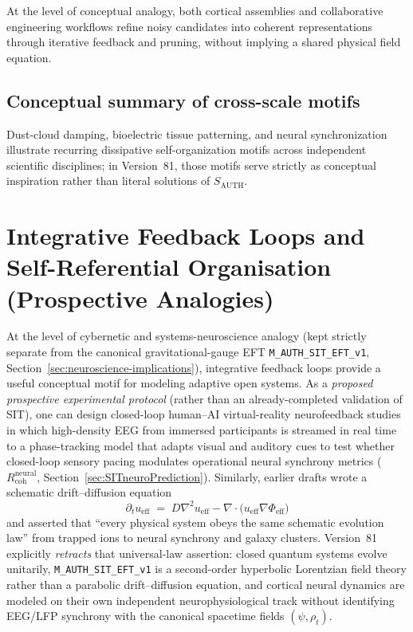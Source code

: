 At the level of conceptual analogy, both cortical assemblies and collaborative engineering workflows refine noisy candidates into coherent representations through iterative feedback and pruning, without implying a shared physical field equation.

\subsection*{Conceptual summary of cross-scale motifs}

Dust-cloud damping, bioelectric tissue patterning, and neural synchronization illustrate recurring dissipative self-organization motifs across independent scientific disciplines; in Version~81, those motifs serve strictly as conceptual inspiration rather than literal solutions of $S_{\mathrm{AUTH}}$.

\section{Integrative Feedback Loops and Self-Referential Organisation (Prospective Analogies)}
\label{sec:integrative-feedback}

At the level of cybernetic and systems-neuroscience analogy (kept strictly separate from the canonical gravitational-gauge EFT \texttt{M\_AUTH\_SIT\_EFT\_v1}, Section~\ref{sec:neuroscience-implications}), integrative feedback loops provide a useful conceptual motif for modeling adaptive open systems. As a \emph{proposed prospective experimental protocol} (rather than an already-completed validation of SIT), one can design closed-loop human--AI virtual-reality neurofeedback studies in which high-density EEG from immersed participants is streamed in real time to a phase-tracking model that adapts visual and auditory cues to test whether closed-loop sensory pacing modulates operational neural synchrony metrics ($R_{\mathrm{coh}}^{\mathrm{neural}}$, Section~\ref{sec:SITneuroPrediction}). Similarly, earlier drafts wrote a schematic drift--diffusion equation
\[
\partial_t u_{\mathrm{eff}}
   \;=\;
   D\nabla^{2} u_{\mathrm{eff}}
   - \nabla\!\cdot\!\bigl(u_{\mathrm{eff}}\nabla\Phi_{\mathrm{eff}}\bigr)
\]
and asserted that ``every physical system obeys the same schematic evolution law'' from trapped ions to neural synchrony and galaxy clusters. Version~81 explicitly \emph{retracts} that universal-law assertion: closed quantum systems evolve unitarily, \texttt{M\_AUTH\_SIT\_EFT\_v1} is a second-order hyperbolic Lorentzian field theory rather than a parabolic drift--diffusion equation, and cortical neural dynamics are modeled on their own independent neurophysiological track without identifying EEG/LFP synchrony with the canonical spacetime fields $(\psi, \rho_t)$.


